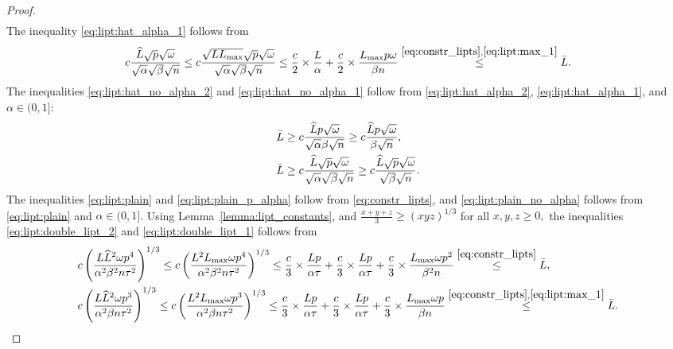 \documentclass{article} %
\theoremstyle{plain}
\theoremstyle{definition}
\theoremstyle{remark}
\begin{document}
\begin{proof}
\begin{align*}
  \end{align*}
  The inequality \eqref{eq:lipt:hat_alpha_1} follows from
  \begin{align*}
    c\frac{\widehat{L} \sqrt{p} \sqrt{\omega}}{\sqrt{\alpha} \sqrt{\beta} \sqrt{n}} \leq c\frac{\sqrt{L L_{\max}} \sqrt{p} \sqrt{\omega}}{\sqrt{\alpha} \sqrt{\beta} \sqrt{n}} \leq \frac{c}{2} \times \frac{L}{\alpha}+ \frac{c}{2} \times \frac{L_{\max} p \omega}{\beta n} \overset{\eqref{eq:constr_lipts}, \eqref{eq:lipt:max_1}}{\leq} \bar{L}.
  \end{align*}
  The inequalities \eqref{eq:lipt:hat_no_alpha_2} and \eqref{eq:lipt:hat_no_alpha_1} follow from \eqref{eq:lipt:hat_alpha_2}, \eqref{eq:lipt:hat_alpha_1}, and $\alpha \in (0, 1]:$
  \begin{align*}
    &\bar{L} \geq c\frac{\widehat{L} p \sqrt{\omega}}{\sqrt{\alpha} \beta \sqrt{n}} \geq c\frac{\widehat{L} p \sqrt{\omega}}{\beta \sqrt{n}}, \\
    &\bar{L} \geq c\frac{\widehat{L} \sqrt{p} \sqrt{\omega}}{\sqrt{\alpha} \sqrt{\beta} \sqrt{n}} \geq c\frac{\widehat{L} \sqrt{p} \sqrt{\omega}}{\sqrt{\beta} \sqrt{n}}.
  \end{align*}
  The inequalities \eqref{eq:lipt:plain} and \eqref{eq:lipt:plain_p_alpha} follow from \eqref{eq:constr_lipts}, and \eqref{eq:lipt:plain_no_alpha} follows from \eqref{eq:lipt:plain} and $\alpha \in (0, 1].$
  Using Lemma~\ref{lemma:lipt_constants}, and $\frac{x+y+z}{3} \geq (x y z)^{1/3}$ for all $x, y, z\geq 0,$ the inequalities \eqref{eq:lipt:double_lipt_2} and \eqref{eq:lipt:double_lipt_1} follows from
  \begin{align*}
    &c \left(\frac{L \widehat{L}^2 \omega p^4}{\alpha^2 \beta^2 n \tau^2}\right)^{1/3} \leq c \left(\frac{L^2 L_{\max} \omega p^4}{\alpha^2 \beta^2 n \tau^2}\right)^{1/3} \leq \frac{c}{3} \times \frac{L p}{\alpha \tau} + \frac{c}{3} \times \frac{L p}{\alpha \tau} + \frac{c}{3} \times \frac{L_{\max} \omega p^2}{\beta^2 n} \overset{\eqref{eq:constr_lipts}}{\leq} \bar{L}, \\
    &c \left(\frac{L \widehat{L}^2 \omega p^3}{\alpha^2 \beta n \tau^2}\right)^{1/3} \leq c \left(\frac{L^2 L_{\max} \omega p^3}{\alpha^2 \beta n \tau^2}\right)^{1/3} \leq \frac{c}{3} \times \frac{L p}{\alpha \tau} + \frac{c}{3} \times \frac{L p}{\alpha \tau}+ \frac{c}{3} \times \frac{L_{\max} \omega p}{\beta n} \overset{\eqref{eq:constr_lipts}, \eqref{eq:lipt:max_1}}{\leq} \bar{L}.
  \end{align*}
\end{proof}
\end{document}
